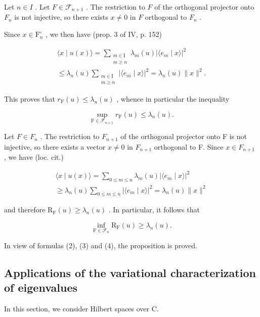 Let \(n \in I\) . Let \(F \in \mathcal{F}_{n+1}\) . The restriction to \(F\) of the orthogonal projector onto \(F_n\) is not injective, so there exists \(x \neq 0\) in \(F\) orthogonal to \(F_n\) .

Since \(x \in \mathrm{F}_{n}^{\circ}\) , we then have (prop. 3 of IV, p. 152)

\[
\begin{array}{l}\langle x\mid u(x)\rangle = \sum_{\substack{m\in \mathrm{I}\\ m\geqslant n}}\lambda_{m}(u)|\langle e_{m}\mid x\rangle |^{2}\\ \leqslant \lambda_{n}(u)\sum_{\substack{m\in \mathrm{I}\\ m\geqslant n}}|\langle e_{m}\mid x\rangle |^{2} = \lambda_{n}(u)\| x\|^{2}. \end{array}
\]

This proves that \(r_{\mathrm{F}}(u)\leqslant\lambda_{n}(u)\) , whence in particular the inequality

\[
\sup _ {\mathrm{F} \in \mathscr {F} _ {n + 1}} r _ {\mathrm{F}} (u) \leqslant \lambda_ {n} (u).\tag{3}
\]

Let \(F \in F_{n}\) . The restriction to \(F_{n+1}\) of the orthogonal projector onto F is not injective, so there exists a vector \(x \neq 0\) in \(F_{n+1}\) orthogonal to F. Since \(x \in F_{n+1}\) , we have (loc. cit.)

\[
\begin{array}{c} \langle x \mid u (x) \rangle = \sum_ {0 \leqslant m \leqslant n} \lambda_ {m} (u) | \langle e _ {m} \mid x \rangle | ^ {2} \\ \geqslant \lambda_ {n} (u) \sum_ {0 \leqslant m \leqslant n} | \langle e _ {m} \mid x \rangle | ^ {2} = \lambda_ {n} (u) \| x \| ^ {2} \end{array}
\]

and therefore \(\mathrm{R_F}(u) \geqslant \lambda_n(u)\) . In particular, it follows that

\[
\inf _ {\mathrm{F} \in \mathcal {F} _ {n}} \mathrm{R} _ {\mathrm{F}} (u) \geqslant \lambda_ {n} (u).\tag{4}
\]

In view of formulas (2), (3) and (4), the proposition is proved.

\subsection{Applications of the variational characterization of eigenvalues}

In this section, we consider Hilbert spaces over C.

